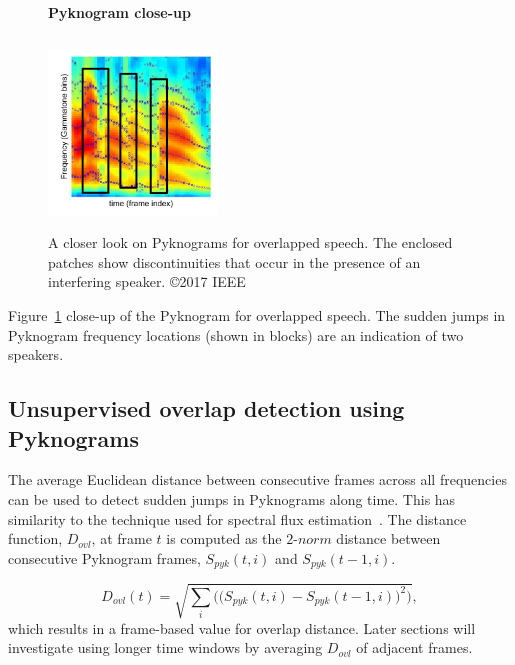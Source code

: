 {\begin{figure}[h!]
	\centering
	\vspace{1mm}
	\textbf{Pyknogram close-up}\par\medskip
	\vspace{-1mm}
	\includegraphics[height =2.0in, width=0.4\textwidth]{figures/co-channel_pyknogram-crop}
	\vspace{-1mm}
	\caption{ A closer look on Pyknograms for overlapped speech. The enclosed patches show discontinuities that occur in the presence of an interfering speaker. \copyright 2017 IEEE}
	\vspace{-1mm}
	\label{fig:ch2_pyknograms_for_overlaps}
\end{figure}

Figure~\ref{fig:ch2_pyknograms_for_overlaps} close-up of the Pyknogram for overlapped speech. 
The sudden jumps in Pyknogram frequency locations (shown in blocks) are an indication of two speakers. 

\newpage
\subsection{Unsupervised overlap detection using Pyknograms}
\label{ssec:unsupervised_ovl_det_pykno}
The average Euclidean distance between consecutive frames across all frequencies can be used to detect sudden jumps in Pyknograms along time. 
This has similarity to the technique used for spectral flux estimation~\cite{Rossignol_spectralflux}. 
The distance function, $D_{ovl}$, at frame $t$ is computed as the $2$-$norm$ distance between consecutive Pyknogram frames, $S_{pyk}(t,i)$ and $S_{pyk}(t-1,i)$. 

\begin{equation}
\label{eq:ovl_det_score}
D_{ovl}(t) = \sqrt{\sum_i\Big(\big(S_{pyk}(t,i)-S_{pyk}(t-1,i)\big)^2\Big)},
\end{equation}
which results in a frame-based value for overlap distance. 
Later sections will investigate using longer time windows by averaging $D_{ovl}$ of adjacent frames. 

}
